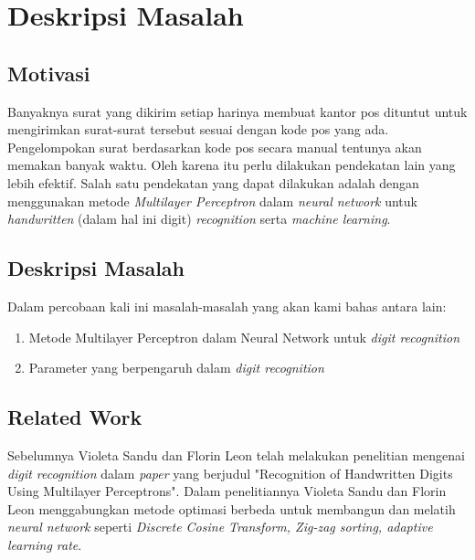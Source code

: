 \section{Deskripsi Masalah}

	\subsection{Motivasi}
	Banyaknya surat yang dikirim setiap harinya membuat kantor pos dituntut untuk mengirimkan surat-surat tersebut sesuai dengan kode pos yang ada. Pengelompokan surat berdasarkan kode pos secara manual tentunya akan memakan banyak waktu. Oleh karena itu perlu dilakukan pendekatan lain yang lebih efektif. Salah satu pendekatan yang dapat dilakukan adalah dengan menggunakan metode \textit{Multilayer Perceptron} dalam \textit{neural network} untuk \textit{handwritten} (dalam hal ini digit) \textit{recognition} serta \textit{machine learning}. 


	\subsection{Deskripsi Masalah}
	Dalam percobaan kali ini masalah-masalah yang akan kami bahas antara lain:
	\begin{enumerate}
		\item Metode Multilayer Perceptron dalam Neural Network untuk \textit{digit recognition} 
	  	\item Parameter yang berpengaruh dalam \textit{digit recognition}
	\end{enumerate}

	\subsection{Related Work}
	Sebelumnya Violeta Sandu dan Florin Leon telah melakukan penelitian mengenai \textit{digit recognition} dalam \textit{paper} yang berjudul "Recognition of Handwritten Digits Using Multilayer Perceptrons". Dalam penelitiannya Violeta Sandu dan Florin Leon menggabungkan metode optimasi berbeda untuk membangun dan melatih \textit{neural network} seperti \textit{Discrete Cosine Transform, Zig-zag sorting, adaptive learning rate}.